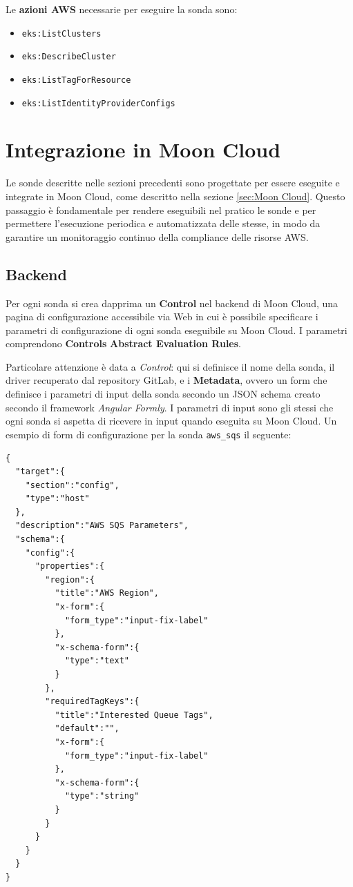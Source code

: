 \vspace{1em}

\noindent Le \textbf{azioni AWS} necessarie per eseguire la sonda sono:
\begin{itemize}
    \item \texttt{eks:ListClusters}
    \item \texttt{eks:DescribeCluster}
    \item \texttt{eks:ListTagForResource}
    \item \texttt{eks:ListIdentityProviderConfigs}
\end{itemize}

\section{Integrazione in Moon Cloud}
\label{sec:integrazione}

Le sonde descritte nelle sezioni precedenti sono progettate per essere eseguite e integrate in Moon Cloud, come descritto nella sezione \ref{sec:Moon Cloud}. Questo passaggio è fondamentale per rendere eseguibili nel pratico le sonde e per permettere l'esecuzione periodica e automatizzata delle stesse, in modo da garantire un monitoraggio continuo della compliance delle risorse AWS. 

\subsection{Backend}
\label{sec:backend}

Per ogni sonda si crea dapprima un \textbf{Control} nel backend di Moon Cloud, una pagina di configurazione accessibile via Web in cui è possibile specificare i parametri di configurazione di ogni sonda eseguibile su Moon Cloud. I parametri comprendono \textbf{Controls} \textbf{Abstract Evaluation Rules}. 

Particolare attenzione è data a \textit{Control}: qui si definisce il nome della sonda, il driver recuperato dal repository GitLab, e i \textbf{Metadata}, ovvero un form che definisce i parametri di input della sonda secondo un JSON schema creato secondo il framework \textit{Angular Formly}. I parametri di input sono gli stessi che ogni sonda si aspetta di ricevere in input quando eseguita su Moon Cloud. Un esempio di form di configurazione per la sonda \texttt{aws\_sqs} il seguente:

\begin{lstlisting}[style=myjson, caption={Form di configurazione per la sonda \texttt{aws\_sqs}}]
{
  "target":{
    "section":"config",
    "type":"host"
  },
  "description":"AWS SQS Parameters",
  "schema":{
    "config":{
      "properties":{
        "region":{
          "title":"AWS Region",
          "x-form":{
            "form_type":"input-fix-label"
          },
          "x-schema-form":{
            "type":"text"
          }
        },
        "requiredTagKeys":{
          "title":"Interested Queue Tags",
          "default":"",
          "x-form":{
            "form_type":"input-fix-label"
          },
          "x-schema-form":{
            "type":"string"
          }
        }
      }
    }
  }
}
\end{lstlisting}

